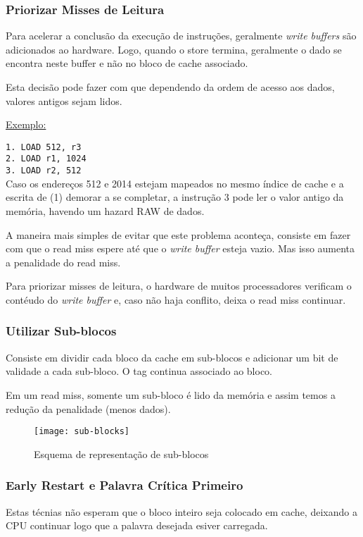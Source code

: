 \subsubsection{Priorizar Misses de Leitura}
Para acelerar a conclusão da execução de instruções, geralmente \textit{write buffers} são adicionados ao hardware. Logo, quando o store termina, geralmente o dado se encontra neste buffer e não no bloco de cache associado.

Esta decisão pode fazer com que dependendo da ordem de acesso aos dados, valores antigos sejam lidos.

\underline{Exemplo:}

\texttt{1. LOAD 512, r3}\\
\texttt{2. LOAD r1, 1024}\\
\texttt{3. LOAD r2, 512} \\

Caso os endereços 512 e 2014 estejam mapeados no mesmo índice de cache e a escrita de (1) demorar a se completar, a instrução 3 pode ler o valor antigo da memória, havendo um hazard RAW de dados.

A maneira mais simples de evitar que este problema aconteça, consiste em fazer com que o read miss espere até que o \textit{write buffer} esteja vazio. Mas isso aumenta a penalidade do read miss.

Para priorizar misses de leitura, o hardware de muitos processadores verificam o contéudo do \textit{write buffer} e, caso não haja conflito, deixa o read miss continuar.



\subsubsection{Utilizar Sub-blocos}
Consiste em dividir cada bloco da cache em sub-blocos e adicionar um bit de validade a cada sub-bloco. O tag continua associado ao bloco.

Em um read miss, somente um sub-bloco é lido da memória e assim temos a redução da penalidade (menos dados).

\begin{figure}[ht]
  \centering
  \texttt{[image: sub-blocks]}
  \label{fig:sub-blocks}
  \caption{Esquema de representação de sub-blocos}
\end{figure}



\subsubsection{Early Restart e Palavra Crítica Primeiro}
Estas técnias não esperam que o bloco inteiro seja colocado em cache, deixando a CPU continuar logo que a palavra desejada esiver carregada.

